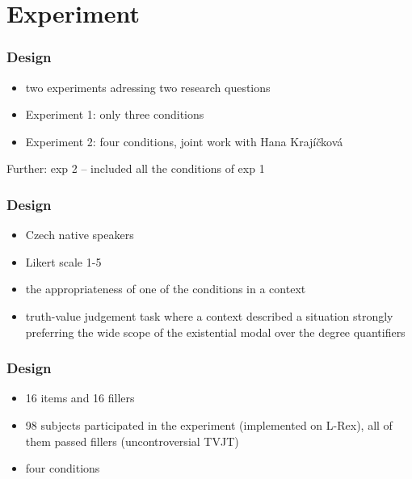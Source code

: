 \documentclass[10pt
]{beamer}
\begin{document}
\section{Experiment}

\begin{frame}
  \frametitle{Design}

\begin{itemize}

  \item two experiments adressing two research questions  
  \item Experiment 1: only three conditions
  \item Experiment 2: four conditions, joint work with Hana Krajíčková
\end{itemize}
  

Further: exp 2 -- included all the conditions of exp 1

\end{frame}

\begin{frame}
  \frametitle{Design}

  \begin{itemize}
    \item Czech native speakers 
    \item Likert scale 1-5
    \item  the appropriateness of one of the conditions in a context
    \item truth-value judgement task where a context described a situation strongly preferring the wide scope of the existential modal over the degree quantifiers
  \end{itemize}
\end{frame}

\begin{frame}
  \frametitle{Design}

\begin{itemize}
    \item 16 items and 16 fillers
    \item 98 subjects participated in the experiment (implemented on L-Rex), all of them passed fillers (uncontroversial TVJT)
    \item four conditions
  \end{itemize}
  

\end{frame}
\end{document}
